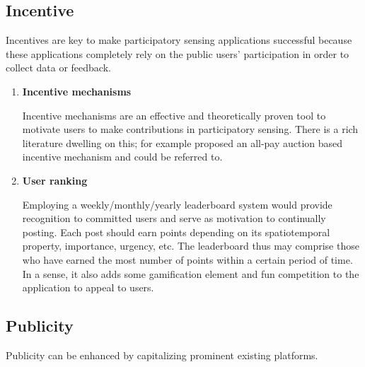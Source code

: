 \documentclass[conference,10pt]{IEEEtran}
\begin{document}
\subsection{Incentive}

Incentives are key to make participatory sensing applications successful because these applications completely rely on the public users' participation in order to collect data or feedback.

\begin{enumerate}[resume,leftmargin=1.5em]
\item{\textbf{Incentive mechanisms}} \par Incentive mechanisms are an effective and theoretically proven tool to motivate users to make contributions in participatory sensing. There is a rich literature dwelling on this; for example \cite{infocom14prof} proposed an all-pay auction based incentive mechanism and could be referred to.

\item{\textbf{User ranking}} \par Employing a weekly/monthly/yearly leaderboard system would provide recognition to committed users and serve as motivation to continually posting. Each post should earn points depending on its spatiotemporal property, importance, urgency, etc. The leaderboard thus may comprise those who have earned the most number of points within a certain period of time. In a sense, it also adds some gamification element and fun competition to the application to appeal to users.
\end{enumerate}

\subsection{Publicity}

Publicity can be enhanced by capitalizing prominent existing platforms.
 
\end{document}
